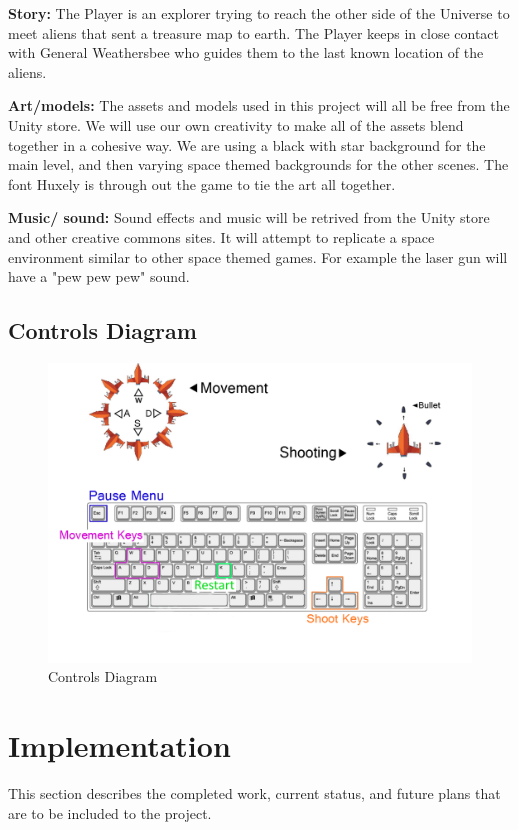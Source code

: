 \documentclass[12pt]{article}       %
\begin{document}
	{\bf Story:} The Player is an explorer trying to reach the other side of the Universe to meet aliens that sent a treasure map to earth. The Player keeps in close contact with General Weathersbee who guides them to the last known location of the aliens. 

	{\bf Art/models:} The assets and models used in this project will all be free from the Unity store. We will use our own creativity to make all of the assets blend together in a cohesive way. We are using a black with star background for the main level, and then varying space themed backgrounds for the other scenes. The font Huxely is through out the game to tie the art all together.  

	{\bf Music/ sound:} Sound effects and music will be retrived from the Unity store and other creative commons sites. It will attempt to replicate a space environment similar to other space themed games. For example the laser gun will have a "pew pew pew" sound. 


\subsection{Controls Diagram}

\begin{figure} [H]
\centering
\includegraphics[width=6.3 in]{ControlDiagramFinal.png}
\caption{Controls Diagram} \label{Controls}
\end{figure}


\section{Implementation} %
\label{sec:history}
This section describes the completed work, current status, and future plans that are to be included to the project.
\end{document}
